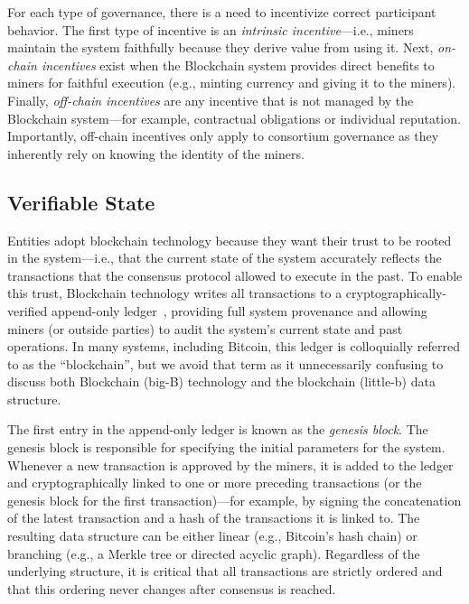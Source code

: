 For each type of governance, there is a need to incentivize correct participant behavior.
The first type of incentive is an \emph{intrinsic incentive}---i.e., miners maintain the system faithfully because they derive value from using it. Next, \emph{on-chain incentives} exist when the Blockchain system provides direct benefits to miners for faithful execution (e.g., minting currency and giving it to the miners). Finally, \emph{off-chain incentives} are any incentive that is not managed by the Blockchain system---for example, contractual obligations or individual reputation.
Importantly, off-chain incentives only apply to consortium governance as they inherently rely on knowing the identity of the miners.


\subsection{Verifiable State}
Entities adopt blockchain technology because they want their trust to be rooted in the system---i.e., that the current state of the system accurately reflects the transactions that the consensus protocol allowed to execute in the past.
To enable this trust, Blockchain technology writes all transactions to a cryptographically-verified append-only ledger~\cite{tamassia2003authenticated}, providing full system provenance and allowing miners (or outside parties) to audit the system's current state and past operations.
In many systems, including Bitcoin, this ledger is colloquially referred to as the ``blockchain'', but we avoid that term as it unnecessarily confusing to discuss both Blockchain (big-B) technology and the blockchain (little-b) data structure.

The first entry in the append-only ledger is known as the \emph{genesis block}.
The genesis block is responsible for specifying the initial parameters for the system.
Whenever a new transaction is approved by the miners, it is added to the ledger and cryptographically linked to one or more preceding transactions (or the genesis block for the first transaction)---for example, by signing the concatenation of the latest transaction and a hash of the transactions it is linked to.
The resulting data structure can be either linear (e.g., Bitcoin's hash chain) or branching (e.g., a Merkle tree or directed acyclic graph).
Regardless of the underlying structure, it is critical that all transactions are strictly ordered and that this ordering never changes after consensus is reached.

